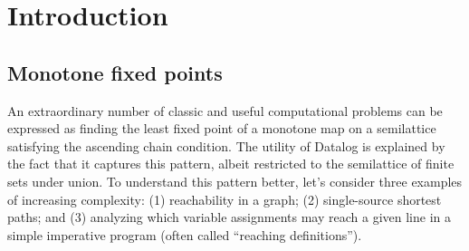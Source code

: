 \chapter{Introduction}


\section{Monotone fixed points}


An extraordinary number of classic and useful computational problems can be
expressed as finding the least fixed point of a monotone map on a semilattice
satisfying the ascending chain condition. The utility of Datalog is explained by
the fact that it captures this pattern, albeit restricted to the semilattice of
finite sets under union. To understand this pattern better, let's consider three
examples of increasing complexity:
%
(1) reachability in a graph;
(2) single-source shortest paths;
and (3) analyzing which variable assignments may reach a given line in a simple
imperative program (often called ``reaching definitions'').

